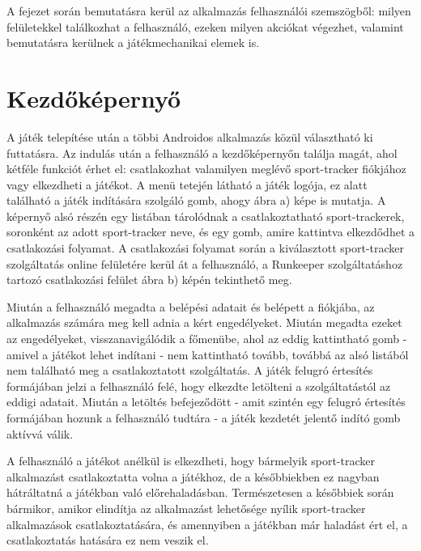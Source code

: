 A fejezet során bemutatásra kerül az alkalmazás felhasználói szemszögből: milyen felületekkel találkozhat a felhasználó, ezeken milyen akciókat végezhet, valamint bemutatásra kerülnek a játékmechanikai elemek is.


\section{Kezdőképernyő}
\label{kezdokepernyo}

A játék telepítése után a többi Androidos alkalmazás közül választható ki futtatásra. 
Az indulás után a felhasználó a kezdőképernyőn találja magát, ahol kétféle funkciót érhet el: csatlakozhat valamilyen meglévő sport-tracker fiókjához vagy elkezdheti a játékot. 
A menü tetején látható a játék logója, ez alatt található a játék indítására szolgáló gomb, ahogy  ábra a) képe is mutatja. 
A képernyő alsó részén egy listában tárolódnak a csatlakoztatható sport-trackerek, soronként az adott sport-tracker neve, és egy gomb, amire kattintva elkezdődhet a csatlakozási folyamat. 
A csatlakozási folyamat során a kiválasztott sport-tracker szolgáltatás online felületére kerül át a felhasználó, a Runkeeper szolgáltatáshoz tartozó csatlakozási felület  ábra b) képén tekinthető meg. 

Miután a felhasználó megadta a belépési adatait és belépett a fiókjába, az alkalmazás számára meg kell adnia a kért engedélyeket. 
Miután megadta ezeket az engedélyeket, visszanavigálódik a főmenübe, ahol az eddig kattintható gomb - amivel a játékot lehet indítani - nem kattintható tovább, továbbá az alsó listából nem található meg a csatlakoztatott szolgáltatás. 
A játék felugró értesítés formájában jelzi a felhasználó felé, hogy elkezdte letölteni a szolgáltatástól az eddigi adatait. 
Miután a letöltés befejeződött - amit szintén egy felugró értesítés formájában hozunk a felhasználó tudtára - a játék kezdetét jelentő indító gomb aktívvá válik.  

A felhasználó a játékot anélkül is elkezdheti, hogy bármelyik sport-tracker alkalmazást csatlakoztatta volna a játékhoz, de a későbbiekben ez nagyban hátráltatná a játékban való előrehaladásban. 
Természetesen a későbbiek során bármikor, amikor elindítja az alkalmazást lehetősége nyílik sport-tracker alkalmazások csatlakoztatására, és amennyiben a játékban már haladást ért el, a csatlakoztatás hatására ez nem veszik el. 

